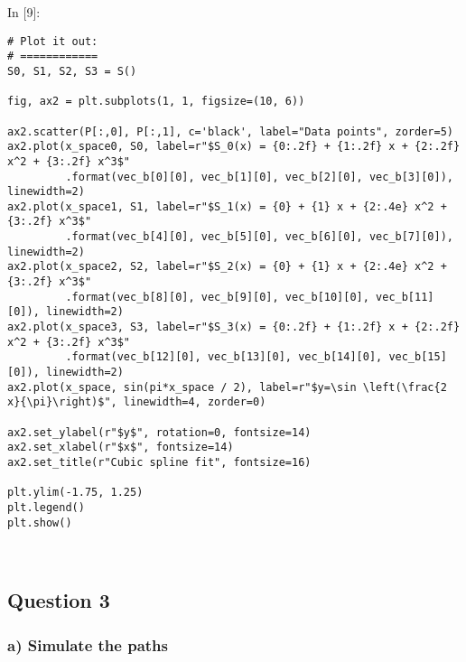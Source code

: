 \documentclass[11pt]{article}
\newif\ifcode
\newif\ifleftmargins
\newlength{\promptlength}
\newcommand{\prompt}[3]{
        \needspace{1.1cm}
        \settowidth{\promptlength}{ #1 [#3] }
        \ifleftmargins\hspace{-\promptlength}\hspace{-5pt}\fi
        {\color{#2}#1 [#3]:}
        \ifleftmargins\vspace{-2.7ex}\fi
    }
\begin{document}
    
\prompt{In}{incolor}{9}
\codetrue
\begin{tcolorbox}[breakable, size=fbox, boxrule=1pt, pad at break*=1mm, colback=cellbackground, colframe=cellborder]
\begin{verbatim}
# Plot it out:
# ============
S0, S1, S2, S3 = S()

fig, ax2 = plt.subplots(1, 1, figsize=(10, 6))

ax2.scatter(P[:,0], P[:,1], c='black', label="Data points", zorder=5)
ax2.plot(x_space0, S0, label=r"$S_0(x) = {0:.2f} + {1:.2f} x + {2:.2f} x^2 + {3:.2f} x^3$"
         .format(vec_b[0][0], vec_b[1][0], vec_b[2][0], vec_b[3][0]), linewidth=2)
ax2.plot(x_space1, S1, label=r"$S_1(x) = {0} + {1} x + {2:.4e} x^2 + {3:.2f} x^3$"
         .format(vec_b[4][0], vec_b[5][0], vec_b[6][0], vec_b[7][0]), linewidth=2)
ax2.plot(x_space2, S2, label=r"$S_2(x) = {0} + {1} x + {2:.4e} x^2 + {3:.2f} x^3$"
         .format(vec_b[8][0], vec_b[9][0], vec_b[10][0], vec_b[11][0]), linewidth=2)
ax2.plot(x_space3, S3, label=r"$S_3(x) = {0:.2f} + {1:.2f} x + {2:.2f} x^2 + {3:.2f} x^3$"
         .format(vec_b[12][0], vec_b[13][0], vec_b[14][0], vec_b[15][0]), linewidth=2)
ax2.plot(x_space, sin(pi*x_space / 2), label=r"$y=\sin \left(\frac{2 x}{\pi}\right)$", linewidth=4, zorder=0)

ax2.set_ylabel(r"$y$", rotation=0, fontsize=14)
ax2.set_xlabel(r"$x$", fontsize=14)
ax2.set_title(r"Cubic spline fit", fontsize=16)

plt.ylim(-1.75, 1.25)
plt.legend()
plt.show()
\end{verbatim}
\end{tcolorbox}
\codefalse

    \begin{center}
    \end{center}
    { \hspace*{\fill} \\}
    
    \hypertarget{question-3}{%
\subsection{Question 3}\label{question-3}}

    \hypertarget{a-simulate-the-paths}{%
\subsubsection{a) Simulate the paths}\label{a-simulate-the-paths}}
\end{document}
